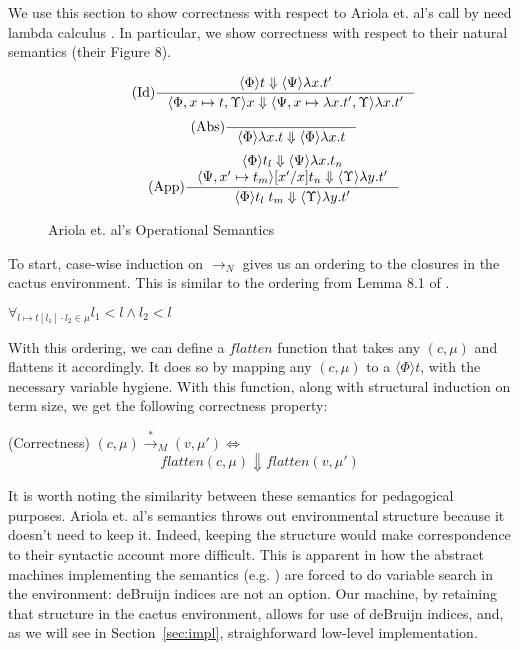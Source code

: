 We use this section to show correctness with respect to Ariola et. al's call by
need lambda calculus \cite{ariola1995call}. In particular, we show correctness
with respect to their natural semantics (their Figure 8). 

\begin{figure}
\begin{align*}
\tag{Id} \inference
{\langle \Phi \rangle t \Downarrow \langle \Psi \rangle \lambda x.t'}
{\langle \Phi, x \mapsto t, \Upsilon \rangle x \Downarrow \langle \Psi, x
\mapsto \lambda x.t', \Upsilon \rangle \lambda x.t'}
\end{align*}
\begin{align*}
\tag{Abs} \inference 
{}
{\langle \Phi \rangle \lambda x . t \Downarrow \langle \Phi \rangle \lambda x.t}
\end{align*}
\begin{align*}
\tag{App} \inference
{\langle \Phi \rangle t_l \Downarrow \langle \Psi \rangle \lambda 
x.t_n \\ \langle \Psi, x' \mapsto t_m \rangle [x'/x]t_n \Downarrow \langle
\Upsilon \rangle \lambda y.t'}
{\langle \Phi \rangle t_l \; t_m \Downarrow \langle \Upsilon \rangle \lambda y.t'}
\end{align*}
\caption{Ariola et. al's Operational Semantics}
\label{fig:calccact}
\end{figure}

To start, case-wise induction on $\rightarrow_{N}$ gives us an ordering to the
closures in the cactus environment. This is similar to the ordering from Lemma
8.1 of \cite{ariola1995call}.

{\lemma $\forall_{l \mapsto t[l_1] \cdot l_2 \in \mu} l_1 < l \wedge l_2 < l$}
\vspace{2mm}

With this ordering, we can define a $flatten$ function that takes any $(c, \mu)$
and flattens it accordingly. It does so by mapping any $(c, \mu)$ to a $\langle
\Phi \rangle t$, with the necessary variable hygiene. With this function, along
with structural induction on term size, we get the following correctness
property:

{\prop \textnormal{(Correctness)} $(c, \mu) \xrightarrow{* }_{M} (v, \mu') \iff$
$$flatten(c,\mu) \Downarrow flatten(v, \mu') $$}

It is worth noting the similarity between these semantics for pedagogical
purposes. Ariola et. al's semantics throws out environmental structure because
it doesn't need to keep it. Indeed, keeping the structure would make
correspondence to their syntactic account more difficult. This is apparent in
how the abstract machines implementing the semantics (e.g.
\cite{garcia2009lazy}) are forced to do variable search in the environment:
deBruijn indices are not an option. Our machine, by retaining that structure in
the cactus environment, allows for use of deBruijn indices, and, as we will see
in Section~\ref{sec:impl}, straighforward low-level implementation.

